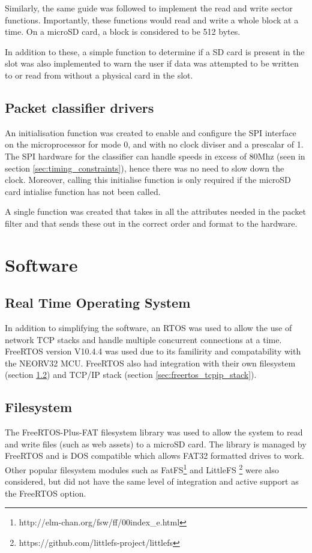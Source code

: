 Similarly, the same guide was followed to implement the read and write sector functions. Importantly, these functions would read and write a whole block at a time. On a microSD card, a block is considered to be 512 bytes. 


In addition to these, a simple function to determine if a SD card is present in the slot was also implemented to warn the user if data was attempted to be written to or read from without a physical card in the slot. 





\subsection{Packet classifier drivers}
\label{sec:packet_filter_driver}
An initialisation function was created to enable and configure the SPI interface on the microprocessor for mode 0, and with no clock diviser and a prescalar of 1. The SPI hardware for the classifier can handle speeds in excess of 80Mhz (seen in section \ref{sec:timing_constraints}), hence there was no need to slow down the clock. Moreover, calling this initialise function is only required if the microSD card intialise function has not been called. 

A single function was created that takes in all the attributes needed in the packet filter and that sends these out in the correct order and format to the hardware. 








\section{Software}

\subsection{Real Time Operating System}
In addition to simplifying the software, an RTOS was used to allow the use of network TCP stacks and handle multiple concurrent connections at a time. FreeRTOS version V10.4.4 was used due to its familirity and compatability with the NEORV32 MCU. FreeRTOS also had integration with their own filesystem (section \ref{sec:freertos_filesystem}) and TCP/IP stack (section \ref{sec:freertos_tcpip_stack}).

\subsection{Filesystem}
\label{sec:freertos_filesystem}
The FreeRTOS-Plus-FAT filesystem library was used to allow the system to read and write files (such as web assets) to a microSD card. The library is managed by FreeRTOS and is DOS compatible which allows FAT32 formatted drives to work. Other popular filesystem modules such as FatFS\footnote[1]{http://elm-chan.org/fsw/ff/00index\_e.html} and LittleFS \footnote[2]{https://github.com/littlefs-project/littlefs} were also considered, but did not have the same level of integration and active support as the FreeRTOS option. 


